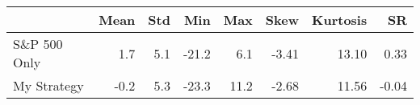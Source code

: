 \begin{tabular}{lrrrrrrr}
\hline
              &   Mean &   Std &   Min &   Max &   Skew &   Kurtosis &    SR \\
\hline
 S\&P 500 Only &    1.7 &   5.1 & -21.2 &   6.1 &  -3.41 &      13.10 &  0.33 \\
 My Strategy  &   -0.2 &   5.3 & -23.3 &  11.2 &  -2.68 &      11.56 & -0.04 \\
\hline
\end{tabular}